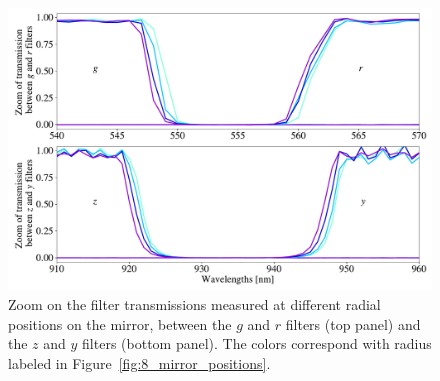\begin{figure}
    \centering
    \includegraphics[width=1\columnwidth]{fig/blue_shift_filter_edges.pdf}
    \caption{Zoom on the \SD filter transmissions measured at different radial positions on the mirror, between the $g$ and $r$ filters (top panel) and the $z$ and $y$ filters (bottom panel). The colors correspond with radius labeled in Figure~\ref{fig:8_mirror_positions}.}
    \label{fig:blueshift}
\end{figure}

%
%










